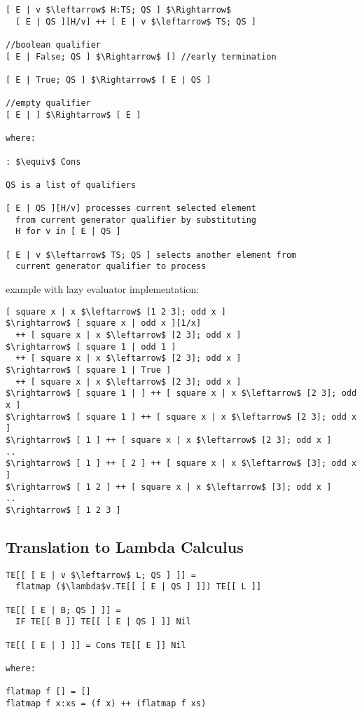 \documentclass[8pt]{extarticle}
\begin{document}
\begin{multicols*}{2}
\begin{lstlisting}
[ E | v $\leftarrow$ H:TS; QS ] $\Rightarrow$
  [ E | QS ][H/v] ++ [ E | v $\leftarrow$ TS; QS ]

//boolean qualifier
[ E | False; QS ] $\Rightarrow$ [] //early termination

[ E | True; QS ] $\Rightarrow$ [ E | QS ]

//empty qualifier
[ E | ] $\Rightarrow$ [ E ]

where:

: $\equiv$ Cons

QS is a list of qualifiers

[ E | QS ][H/v] processes current selected element
  from current generator qualifier by substituting
  H for v in [ E | QS ]

[ E | v $\leftarrow$ TS; QS ] selects another element from
  current generator qualifier to process
\end{lstlisting}

example with lazy evaluator implementation:

\begin{lstlisting}
[ square x | x $\leftarrow$ [1 2 3]; odd x ]
$\rightarrow$ [ square x | odd x ][1/x]
  ++ [ square x | x $\leftarrow$ [2 3]; odd x ]
$\rightarrow$ [ square 1 | odd 1 ]
  ++ [ square x | x $\leftarrow$ [2 3]; odd x ]
$\rightarrow$ [ square 1 | True ]
  ++ [ square x | x $\leftarrow$ [2 3]; odd x ]
$\rightarrow$ [ square 1 | ] ++ [ square x | x $\leftarrow$ [2 3]; odd x ]
$\rightarrow$ [ square 1 ] ++ [ square x | x $\leftarrow$ [2 3]; odd x ]
$\rightarrow$ [ 1 ] ++ [ square x | x $\leftarrow$ [2 3]; odd x ]
..
$\rightarrow$ [ 1 ] ++ [ 2 ] ++ [ square x | x $\leftarrow$ [3]; odd x ]
$\rightarrow$ [ 1 2 ] ++ [ square x | x $\leftarrow$ [3]; odd x ]
..
$\rightarrow$ [ 1 2 3 ]
\end{lstlisting}

\vfill\null
\columnbreak

\subsection{Translation to Lambda Calculus}
\begin{lstlisting}
TE[[ [ E | v $\leftarrow$ L; QS ] ]] =
  flatmap ($\lambda$v.TE[[ [ E | QS ] ]]) TE[[ L ]]

TE[[ [ E | B; QS ] ]] =
  IF TE[[ B ]] TE[[ [ E | QS ] ]] Nil

TE[[ [ E | ] ]] = Cons TE[[ E ]] Nil

where:

flatmap f [] = []
flatmap f x:xs = (f x) ++ (flatmap f xs)


\end{lstlisting}
\end{multicols*}
\end{document}

